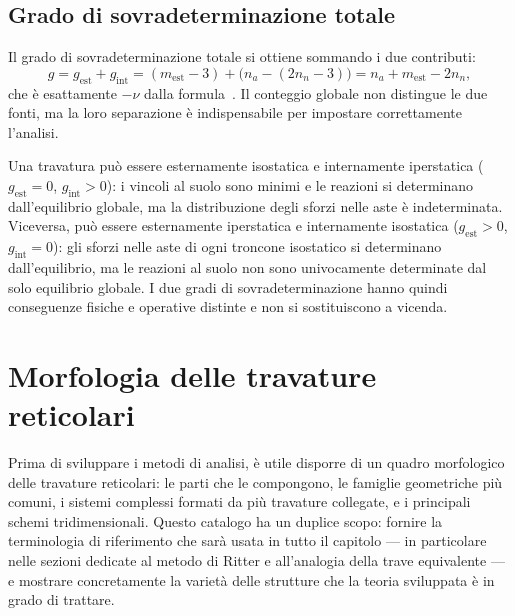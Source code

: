 \subsection{Grado di sovradeterminazione totale}
\label{subsec:sovradet_tot}

Il grado di sovradeterminazione totale si ottiene
sommando i due contributi:
\begin{equation}\label{eq:g_tot}
	g = g_\text{est} + g_\text{int}
	= (m_\text{est} - 3) + \bigl(n_a - (2n_n - 3)\bigr)
	= n_a + m_\text{est} - 2n_n,
\end{equation}
che è esattamente $-\nu$ dalla
formula~. Il
conteggio globale non distingue le due fonti, ma la
loro separazione è indispensabile per impostare
correttamente l'analisi.

\begin{oss}
	Una travatura può essere esternamente isostatica
	e internamente iperstatica ($g_\text{est} = 0$,
	$g_\text{int} > 0$): i vincoli al suolo sono
	minimi e le reazioni si determinano dall'equilibrio
	globale, ma la distribuzione degli sforzi nelle aste
	è indeterminata. Viceversa, può essere esternamente
	iperstatica e internamente isostatica ($g_\text{est} > 0$,
	$g_\text{int} = 0$): gli sforzi nelle aste di ogni
	troncone isostatico si determinano dall'equilibrio,
	ma le reazioni al suolo non sono univocamente
	determinate dal solo equilibrio globale.
	I due gradi di sovradeterminazione hanno quindi
	conseguenze fisiche e operative distinte e
	non si sostituiscono a vicenda.
\end{oss}



\section{Morfologia delle travature reticolari}
\label{sec:morfologia_reticolari}

Prima di sviluppare i metodi di analisi, è utile
disporre di un quadro morfologico delle travature
reticolari: le parti che le compongono, le famiglie
geometriche più comuni, i sistemi complessi formati
da più travature collegate, e i principali schemi
tridimensionali. Questo catalogo ha un duplice scopo:
fornire la terminologia di riferimento che sarà usata
in tutto il capitolo --- in particolare nelle sezioni
dedicate al metodo di Ritter e all'analogia della trave
equivalente --- e mostrare concretamente la varietà
delle strutture che la teoria sviluppata è in grado
di trattare.


